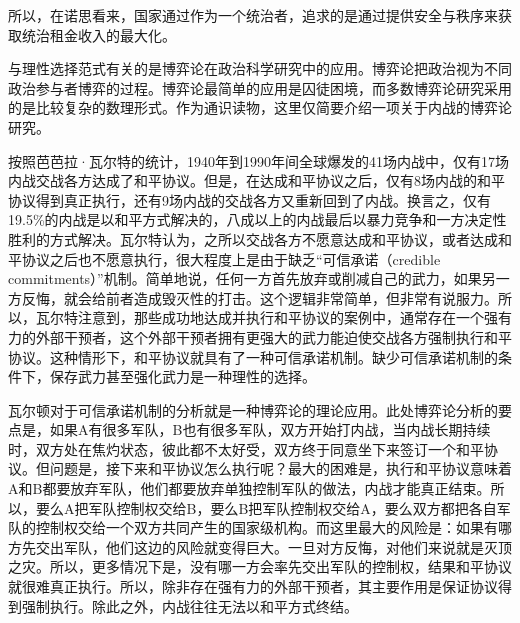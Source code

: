 
所以，在诺思看来，国家通过作为一个统治者，追求的是通过提供安全与秩序来获取统治租金收入的最大化。

与理性选择范式有关的是博弈论在政治科学研究中的应用。博弈论把政治视为不同政治参与者博弈的过程。博弈论最简单的应用是囚徒困境，而多数博弈论研究采用的是比较复杂的数理形式。作为通识读物，这里仅简要介绍一项关于内战的博弈论研究。

按照芭芭拉·瓦尔特的统计，1940年到1990年间全球爆发的41场内战中，仅有17场内战交战各方达成了和平协议。但是，在达成和平协议之后，仅有8场内战的和平协议得到真正执行，还有9场内战的交战各方又重新回到了内战。换言之，仅有19.5\%的内战是以和平方式解决的，八成以上的内战最后以暴力竞争和一方决定性胜利的方式解决。瓦尔特认为，之所以交战各方不愿意达成和平协议，或者达成和平协议之后也不愿意执行，很大程度上是由于缺乏“可信承诺（credible commitments）”机制。简单地说，任何一方首先放弃或削减自己的武力，如果另一方反悔，就会给前者造成毁灭性的打击。这个逻辑非常简单，但非常有说服力。所以，瓦尔特注意到，那些成功地达成并执行和平协议的案例中，通常存在一个强有力的外部干预者，这个外部干预者拥有更强大的武力能迫使交战各方强制执行和平协议。这种情形下，和平协议就具有了一种可信承诺机制。缺少可信承诺机制的条件下，保存武力甚至强化武力是一种理性的选择。

瓦尔顿对于可信承诺机制的分析就是一种博弈论的理论应用。此处博弈论分析的要点是，如果A有很多军队，B也有很多军队，双方开始打内战，当内战长期持续时，双方处在焦灼状态，彼此都不太好受，双方终于同意坐下来签订一个和平协议。但问题是，接下来和平协议怎么执行呢？最大的困难是，执行和平协议意味着A和B都要放弃军队，他们都要放弃单独控制军队的做法，内战才能真正结束。所以，要么A把军队控制权交给B，要么B把军队控制权交给A，要么双方都把各自军队的控制权交给一个双方共同产生的国家级机构。而这里最大的风险是：如果有哪方先交出军队，他们这边的风险就变得巨大。一旦对方反悔，对他们来说就是灭顶之灾。所以，更多情况下是，没有哪一方会率先交出军队的控制权，结果和平协议就很难真正执行。所以，除非存在强有力的外部干预者，其主要作用是保证协议得到强制执行。除此之外，内战往往无法以和平方式终结。

